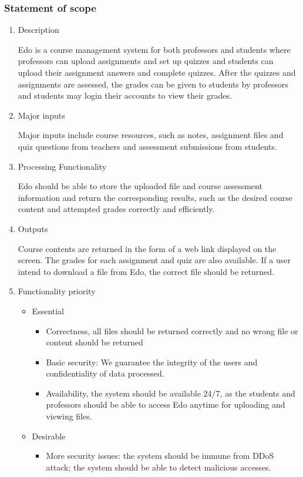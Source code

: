 \documentclass[paper=a4, fontsize=11pt]{scrartcl}
\numberwithin{equation}{section}		%
\numberwithin{figure}{section}			%
\numberwithin{table}{section}				%
\begin{document}
\subsubsection{Statement of scope}
\begin{enumerate}
	\item Description
	\par Edo is a course management system for both professors and students where professors can upload assignments and set up quizzes and students can upload their assignment answers and complete quizzes. After the quizzes and assignments are assessed, the grades can be given to students by professors and students may login their accounts to view their grades.
	\item Major inputs
	\par Major inputs include course resources, such as notes, assignment files and quiz questions from teachers and assessment submissions from students.
	\item Processing Functionality
	\par Edo should be able to store the uploaded file and course assessment information and return the corresponding results, such as the desired course content and attempted grades correctly and efficiently.
	\item Outputs
	\par Course contents are returned in the form of a web link displayed on the screen. The grades for each assignment and quiz are also available. If a user intend to download a file from Edo, the correct file should be returned.
	\item Functionality priority
	\begin{itemize}
		\item Essential
		\begin{itemize}
			\item Correctness, all files should be returned correctly and no wrong file or content should be returned
			\item Basic security: We guarantee the integrity of the users and confidentiality of data processed.
			\item Availability, the system should be available 24/7, as the students and professors should be able to access Edo anytime for uploading and viewing files.
		\end{itemize}
		\item Desirable
		\begin{itemize}
			\item More security issues: the system should be immune from DDoS attack; the system should be able to detect malicious accesses.

\end{itemize}
\end{itemize}
\end{enumerate}
\end{document}
